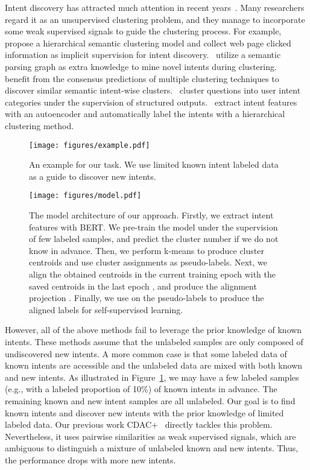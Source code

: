\documentclass[letterpaper]{article} \usepackage{aaai21}  \usepackage{times}  \usepackage{helvet} \usepackage{courier}  \usepackage[hyphens]{url}  \usepackage{graphicx} \urlstyle{rm} \def\UrlFont{\rm}  \usepackage{natbib}  \usepackage{caption} \frenchspacing  \setlength{\pdfpagewidth}{8.5in}  \setlength{\pdfpageheight}{11in}  \usepackage{amsmath}
\begin{document}
	
	Intent discovery has attracted much attention in recent years~\cite{perkins-yang-2019-dialog,ijcai2020-532,10.1145/3366423.3380268}. Many researchers regard it as an unsupervised clustering problem, and they manage to incorporate some weak supervised signals to guide the clustering process. For example,~\citet{hakkani-tr2013a} propose a hierarchical semantic clustering model and collect web page clicked information as implicit supervision for intent discovery.~\citet{hakkani2015clustering} utilize a semantic parsing graph as extra knowledge to mine novel intents during clustering.~\citet{Padmasundari2018} benefit from the consensus predictions of multiple clustering techniques to discover similar semantic intent-wise clusters.~\citet{haponchyk2018supervised} cluster questions into user intent categories under the supervision of structured outputs.~\citet{shi2018auto} extract intent features with an autoencoder and automatically label the intents with a hierarchical clustering method.
	\begin{figure}[t!]
		\centering  
		\texttt{[image: figures/example.pdf]}
		\caption{\label{example} An example for our task. We use limited known intent labeled data as a guide to discover new intents. }
	\end{figure}
	\begin{figure*}
		\centering
		\texttt{[image: figures/model.pdf]}
		\caption{The model architecture of our approach. Firstly, we extract intent features with BERT. We pre-train the model under the supervision of few labeled samples, and predict the cluster number  if we do not know in advance. Then, we perform k-means to produce cluster centroids and use cluster assignments as pseudo-labels. Next, we align the obtained centroids in the current training epoch  with the saved centroids in the last epoch , and produce the alignment projection . Finally, we use  on the pseudo-labels to produce the aligned labels for self-supervised learning.}
		\label{model}
	\end{figure*}

	However, all of the above methods fail to leverage the prior knowledge of known intents. These methods assume that the unlabeled samples are only composed of undiscovered new intents. A more common case is that some labeled data of known intents are accessible and the unlabeled data are mixed with both known and new intents. As illustrated in Figure~\ref{example}, we may have a few labeled samples (e.g., with a labeled proportion of 10\%) of known intents in advance. The remaining known and new intent samples are all unlabeled. Our goal is to find known intents and discover new intents with the prior knowledge of limited labeled data. Our previous work CDAC+~\cite{lin2020discovering} directly tackles this problem. Nevertheless, it uses pairwise similarities as weak supervised signals, which are ambiguous to distinguish a mixture of unlabeled known and new intents. Thus, the performance drops with more new intents.
	
\end{document}
